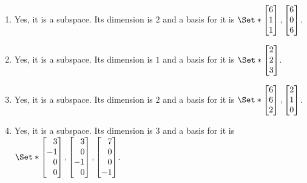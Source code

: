 \begin{exercises}
\begin{problist}
\begin{solution}
\begin{enumerate}
				\item Yes, it is a subspace. Its dimension is $2$ and a basis for it is $\Set*{\mat{6\\1\\1},\mat{6\\0\\6}}$.

				\item Yes, it is a subspace. Its dimension is $1$ and a basis for it is $\Set*{\mat{2\\2\\3}}$.

				\item Yes, it is a subspace. Its dimension is $2$ and a basis for it is $\Set*{\mat{6\\6\\2},\mat{2\\1\\0}}$.

				\item Yes, it is a subspace. Its dimension is $3$ and a basis for it is $\Set*{\mat{3\\-1\\0\\0},\mat{3\\0\\-1\\0},\mat{7\\0\\0\\-1}}$.
			\end{enumerate}
		\end{solution}


\end{problist}
\end{exercises}

